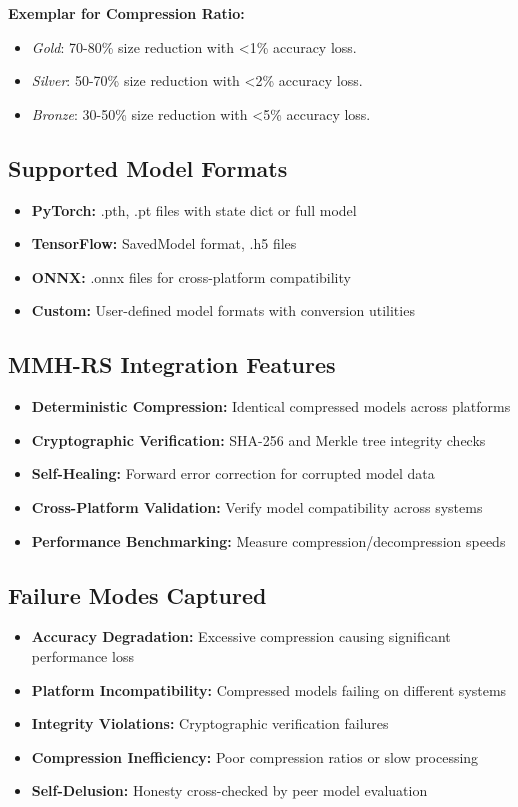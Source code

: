 \textbf{Exemplar for Compression Ratio:}
\begin{itemize}
  \item \emph{Gold}: 70-80\% size reduction with <1\% accuracy loss.
  \item \emph{Silver}: 50-70\% size reduction with <2\% accuracy loss.
  \item \emph{Bronze}: 30-50\% size reduction with <5\% accuracy loss.
\end{itemize}

\subsection*{Supported Model Formats}
\begin{itemize}
  \item \textbf{PyTorch:} .pth, .pt files with state dict or full model
  \item \textbf{TensorFlow:} SavedModel format, .h5 files
  \item \textbf{ONNX:} .onnx files for cross-platform compatibility
  \item \textbf{Custom:} User-defined model formats with conversion utilities
\end{itemize}

\subsection*{MMH-RS Integration Features}
\begin{itemize}
  \item \textbf{Deterministic Compression:} Identical compressed models across platforms
  \item \textbf{Cryptographic Verification:} SHA-256 and Merkle tree integrity checks
  \item \textbf{Self-Healing:} Forward error correction for corrupted model data
  \item \textbf{Cross-Platform Validation:} Verify model compatibility across systems
  \item \textbf{Performance Benchmarking:} Measure compression/decompression speeds
\end{itemize}

\subsection*{Failure Modes Captured}
\begin{itemize}
  \item \textbf{Accuracy Degradation:} Excessive compression causing significant performance loss
  \item \textbf{Platform Incompatibility:} Compressed models failing on different systems
  \item \textbf{Integrity Violations:} Cryptographic verification failures
  \item \textbf{Compression Inefficiency:} Poor compression ratios or slow processing
  \item \textbf{Self-Delusion:} Honesty cross-checked by peer model evaluation
\end{itemize}

